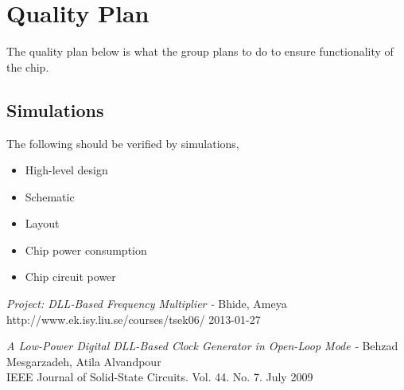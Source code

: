 \documentclass[a4paper,12pt]{article} \usepackage{graphicx}
\begin{document}
\section{Quality Plan} 
The quality plan below is what the group plans to do to ensure functionality of the chip. 
\subsection{Simulations} 
The following should be verified by simulations,

\begin{itemize}
\item High-level design
\item Schematic
\item Layout
\item Chip power consumption
\item Chip circuit power
\end{itemize}

\newpage 
\appendix 
\newpage


\begin{thebibliography}{99}
\textit{Project: DLL-Based Frequency Multiplier - } Bhide,
Ameya
\\ http://www.ek.isy.liu.se/courses/tsek06/ 2013-01-27

\textit{A Low-Power Digital DLL-Based Clock Generator in Open-Loop Mode - }
Behzad Mesgarzadeh, Atila Alvandpour \\
IEEE Journal of Solid-State Circuits. Vol. 44. No. 7. July 2009

\end{thebibliography}
\end{document}
